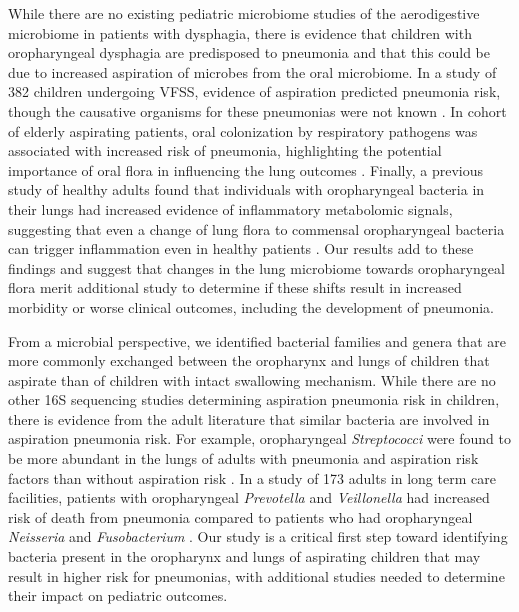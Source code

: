 While there are no existing pediatric microbiome studies of the aerodigestive microbiome in patients with dysphagia, there is evidence that children with oropharyngeal dysphagia are predisposed to pneumonia and that this could be due to increased aspiration of microbes from the oral microbiome.
In a study of 382 children undergoing VFSS, evidence of aspiration predicted pneumonia risk, though the causative organisms for these pneumonias were not known \cite{weir2007pneumoasp}.
In cohort of elderly aspirating patients, oral colonization by respiratory pathogens was associated with increased risk of pneumonia, highlighting the potential importance of oral flora in influencing the lung outcomes \cite{ortega2015oralpatho}.
Finally, a previous study of healthy adults found that individuals with oropharyngeal bacteria in their lungs had increased evidence of inflammatory metabolomic signals, suggesting that even a change of lung flora to commensal oropharyngeal bacteria can trigger inflammation even in healthy patients \cite{segal-2016-inflammation}.
Our results add to these findings and suggest that changes in the lung microbiome towards oropharyngeal flora merit additional study to determine if these shifts result in increased morbidity or worse clinical outcomes, including the development of pneumonia.

From a microbial perspective, we identified bacterial families and genera that are more commonly exchanged between the oropharynx and lungs of children that aspirate than of children with intact swallowing mechanism.
While there are no other 16S sequencing studies determining aspiration pneumonia risk in children, there is evidence from the adult literature that similar bacteria are involved in aspiration pneumonia risk.
For example, oropharyngeal \textit{Streptococci} were found to be more abundant in the lungs of adults with pneumonia and aspiration risk factors than without aspiration risk \cite{akata2016oralstrepto}.
In a study of 173 adults in long term care facilities, patients with oropharyngeal \textit{Prevotella} and \textit{Veillonella} had increased risk of death from pneumonia compared to patients who had oropharyngeal \textit{Neisseria} and \textit{Fusobacterium} \cite{kageyama2017pneumomortality}.
Our study is a critical first step toward identifying bacteria present in the oropharynx and lungs of aspirating children that may result in higher risk for pneumonias, with additional studies needed to determine their impact on pediatric outcomes.

